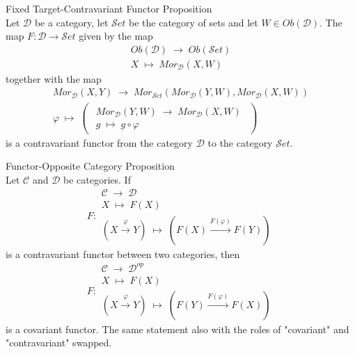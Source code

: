 \begin{proposition}{Fixed Target-Contravariant Functor Proposition}\\
Let $\mathcal{D}$ be a category, let $\mathcal{S}et$ be the category of sets and let $W \in Ob(\mathcal{D})$. The map $F: \mathcal{D} \to \mathcal{S}et$ given by the map
$$\substack{Ob(\mathcal{D}) \; \to \; Ob(\mathcal{S}et)\\
X \; \mapsto \; Mor_\mathcal{D} (X,W)}$$
together with the map
$$\substack{Mor_\mathcal{D} (X,Y) \; \to \; Mor_{\mathcal{S}et} (Mor_\mathcal{D} (Y,W), Mor_\mathcal{D} (X,W)) \\
\varphi \; \mapsto \; \begin{pmatrix}
    \substack{Mor_\mathcal{D} (Y,W) \; \to\; Mor_\mathcal{D} (X,W)\\
    g \; \mapsto \; g \circ \varphi }
\end{pmatrix} }$$
is a contravariant functor from the category $\mathcal{D}$ to the category $\mathcal{S}et$.
\end{proposition}

\begin{proposition}{Functor-Opposite Category Proposition}\\
Let $\mathcal{C}$ and $\mathcal{D}$ be categories. If 
$$F: \substack{\mathcal{C} \;\to\; \mathcal{D}\\
X \; \mapsto \; F(X)\\
(X \overset{\varphi}{\to} Y) \; \mapsto \; (F(X) \overset{F(\varphi)}{\to} F(Y))}$$
is a contravariant functor between two categories, then 
$$F: \substack{\mathcal{C} \;\to\; \mathcal{D}^{op}\\
X \; \mapsto \; F(X)\\
(X \overset{\varphi}{\to} Y) \; \mapsto \; (F(Y) \overset{F(\varphi)}{\to} F(X))}$$
is a covariant functor. The same statement also with the roles of "covariant" and "contravariant" swapped.
\end{proposition}

